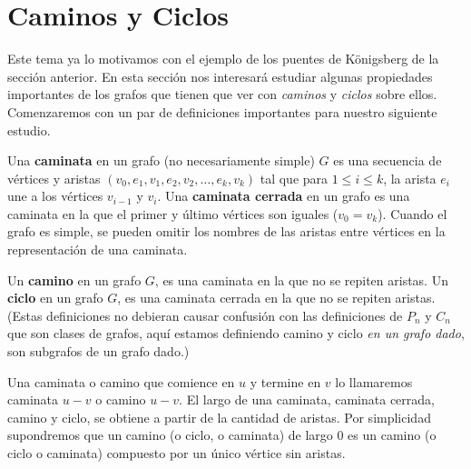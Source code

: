 \section{Caminos y Ciclos}

Este tema ya lo motivamos con el ejemplo de los puentes de K\"onigsberg de la sección anterior.
En esta sección nos interesará estudiar algunas propiedades importantes de los grafos que tienen que ver con \emph{caminos} y \emph{ciclos} sobre ellos.
Comenzaremos con un par de definiciones importantes para nuestro siguiente estudio.

\begin{definicion}
Una {\bf caminata} en un grafo (no necesariamente simple) $G$ es una secuencia de vértices y aristas  $(v_0,e_1,v_1,e_2,v_2,\ldots,e_k,v_k)$ tal que para $1\leq i\leq k$, la arista $e_i$ une a los vértices $v_{i-1}$ y $v_i$.
Una {\bf caminata cerrada} en un grafo es una caminata en la que el primer y último vértices son iguales ($v_0=v_k$).
Cuando el grafo es simple, se pueden omitir los nombres de las aristas entre vértices en la representación de una caminata.

Un {\bf camino} en un grafo $G$, es una caminata en la que no se repiten aristas.
Un {\bf ciclo} en un grafo $G$, es una caminata cerrada en la que no se repiten aristas.
(Estas definiciones no debieran causar confusión con las definiciones de $P_n$ y $C_n$ que son clases de grafos, aquí estamos definiendo camino y ciclo \emph{en un grafo dado}, son subgrafos de un grafo dado.)

Una caminata o camino que comience en $u$ y termine en $v$ lo llamaremos caminata $u-v$ o camino $u-v$.
El largo de una caminata, caminata cerrada, camino y ciclo, se obtiene a partir de la cantidad de aristas.
Por simplicidad supondremos que un camino (o ciclo, o caminata) de largo $0$ es un camino (o ciclo o caminata) compuesto por un único vértice sin aristas.
\end{definicion}

